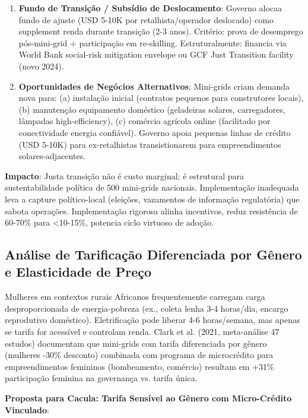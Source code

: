 \documentclass[12pt, a4paper]{article}
\begin{document}
{{{{{{{{{{{{\begin{enumerate}
\item \textbf{Fundo de Transição / Subsídio de Deslocamento}: Governo alocaa fundo de ajuste (USD 5-10K por retalhista/operador deslocado) como supplement renda durante transição (2-3 anos). Critério: prova de desemprego pós-mini-grid + participação em re-skilling. Estruturalmente: financia via World Bank social-risk mitigation envelope ou GCF Just Transition facility (novo 2024).

\item \textbf{Oportunidades de Negócios Alternativos}: Mini-grids criam demanda nova para: (a) instalação inicial (contratos pequenos para construtores locais), (b) manutenção equipamento doméstico (geladeiras solares, carregadores, lâmpadas high-efficiency), (c) comércio agrícola online (facilitado por conectividade energia confiável). Governo apoia pequenas linhas de crédito (USD 5-10K) para ex-retalhistas transistionarem para empreendimentos solares-adjacentes.

\end{enumerate}

\textbf{Impacto}: Justa transição não é custo marginal; é estrutural para sustentabilidade política de 500 mini-grids nacionais. Implementação inadequada leva a capture político-local (eleições, vazamentos de informação regulatória) que sabota operações. Implementação rigorosa alinha incentivos, reduz resistência de 60-70\% para <10-15\%, potencia ciclo virtuoso de adoção.

\subsection{Análise de Tarificação Diferenciada por Gênero e Elasticidade de Preço}

Mulheres em contextos rurais Africanos frequentemente carregam carga desproporcionada de energia-pobreza (ex., coleta lenha 3-4 horas/dia, encargo reprodutivo doméstico). Eletrificação pode liberar 4-6 horas/semana, mas apenas se tarifa for acessível e controlam renda. Clark et al. (2021, meta-análise 47 estudos) documentam que mini-grids com tarifa diferenciada por gênero (mulheres -30\% desconto) combinada com programa de microcrédito para empreendimentos femininos (bombeamento, comércio) resultam em +31\% participação feminina na governança vs. tarifa única.

\textbf{Proposta para Cacula: Tarifa Sensível ao Gênero com Micro-Crédito Vinculado}:

}}}}}}}}}}}}
\end{document}
